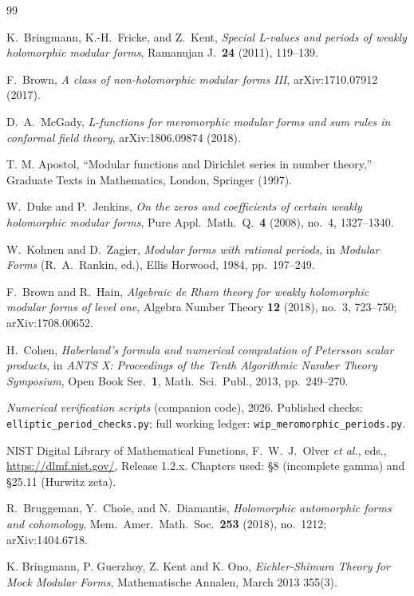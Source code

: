 \documentclass[11pt]{article}
\begin{document}
\begin{thebibliography}{99}

K.\ Bringmann, K.-H.\ Fricke, and Z.\ Kent,
\emph{Special L-values and periods of weakly holomorphic modular forms},
Ramanujan J.\ \textbf{24} (2011), 119--139.

F.\ Brown, \emph{A class of non-holomorphic modular forms III},
arXiv:1710.07912 (2017).

D.\ A.\ McGady,
\emph{L-functions for meromorphic modular forms and sum rules in
conformal field theory},
arXiv:1806.09874 (2018).

T. M. Apostol,
``Modular functions and Dirichlet series in number theory,''
Graduate Texts in Mathematics, London, Springer (1997).


W.\ Duke and P.\ Jenkins,
\emph{On the zeros and coefficients of certain weakly holomorphic modular forms},
Pure Appl.\ Math.\ Q.\ \textbf{4} (2008), no.\ 4, 1327--1340.

W.\ Kohnen and D.\ Zagier,
\emph{Modular forms with rational periods},
in \emph{Modular Forms} (R.~A.\ Rankin, ed.), Ellis Horwood, 1984, pp.\ 197--249.


F.\ Brown and R.\ Hain,
\emph{Algebraic de Rham theory for weakly holomorphic modular forms of level one},
Algebra Number Theory \textbf{12} (2018), no.\ 3, 723--750; arXiv:1708.00652.

H.\ Cohen,
\emph{Haberland's formula and numerical computation of Petersson scalar products},
in \emph{ANTS X: Proceedings of the Tenth Algorithmic Number Theory Symposium},
Open Book Ser.\ \textbf{1}, Math.\ Sci.\ Publ., 2013, pp.\ 249--270.

\emph{Numerical verification scripts} (companion code), 2026.
Published checks: \texttt{elliptic\_period\_checks.py}; full working ledger:
\texttt{wip\_meromorphic\_periods.py}.

NIST Digital Library of Mathematical Functions,
F.~W.~J.\ Olver \emph{et al.}, eds.,
\url{https://dlmf.nist.gov/}, Release 1.2.x.
Chapters used: \S8 (incomplete gamma) and \S25.11 (Hurwitz zeta).


R.\ Bruggeman, Y.\ Choie, and N.\ Diamantis,
\emph{Holomorphic automorphic forms and cohomology},
Mem.\ Amer.\ Math.\ Soc.\ \textbf{253} (2018), no.\ 1212; arXiv:1404.6718.

K. Bringmann, P. Guerzhoy, Z. Kent and K. Ono,
\emph{Eichler-Shimura Theory for Mock Modular Forms},
Mathematische Annalen, March 2013 355(3).


\end{thebibliography}
\end{document}
